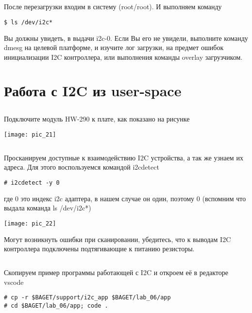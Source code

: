 \subsection{}После перезагрузки входим в систему (root/root). И выполняем команду
\begin{lstlisting}[style=bash]
$ ls /dev/i2c*
\end{lstlisting} 

Вы должны увидеть, в выдачи i2c-0. Если Вы его не увидели, выполните команду dmesg на целевой платформе, и изучите лог загрузки, на предмет ошибок инициализации I2C контроллера, или выполнения команды overlay загрузчиком.

\section{Работа с I2C из user-space}

\subsection{}Подключите модуль HW-290 к плате, как показано на рисунке 
\begin{center}
	\texttt{[image: pic\_21]}
\end{center}

\subsection{}Просканируем доступные к взаимодействию I2C устройства, а так же узнаем их адреса. Для этого воспользуемся командой i2cdetect
\begin{lstlisting}[style=bash]
# i2cdetect -y 0
\end{lstlisting}
где 0 это индекс i2c адаптера, в нашем случае он один, поэтому 0 (вспомним что выдала команда ls /dev/i2c*)

\begin{center}
	\texttt{[image: pic\_22]}
\end{center}

Могут возникнуть ошибки при сканировании, убедитесь, что к выводам I2C контроллера подключены подтягивающие к питанию резисторы.


\subsection{}Скопируем пример программы работающей с I2C и откроем её в редакторе vscode
\begin{lstlisting}[style=bash]
# cp -r $BAGET/support/i2c_app $BAGET/lab_06/app
# cd $BAGET/lab_06/app; code .
\end{lstlisting}

